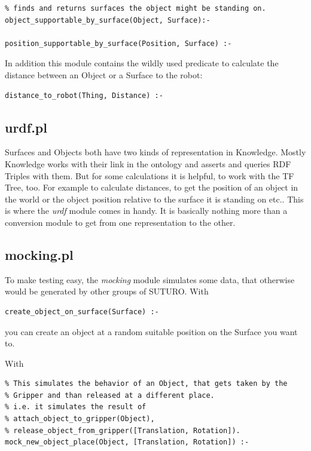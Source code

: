 \documentclass[main.tex]{subfiles}
\begin{document}
\begin{lstlisting}
% finds and returns surfaces the object might be standing on.
object_supportable_by_surface(Object, Surface):-

position_supportable_by_surface(Position, Surface) :-
\end{lstlisting}

In addition this module contains the wildly used predicate to calculate the distance between an Object or a Surface to the robot:

\begin{lstlisting}
distance_to_robot(Thing, Distance) :-
\end{lstlisting}

\subsection{urdf.pl}

Surfaces and Objects both have two kinds of representation in Knowledge. Mostly Knowledge works with their link in the ontology and asserts and queries RDF Triples with them. But for some calculations it is helpful, to work with the TF Tree, too. For example to calculate distances, to get the position of an object in the world or the object position relative to the surface it is standing on etc.. This is where the \textit{urdf} module comes in handy. It is basically nothing more than a conversion module to get from one representation to the other.

\subsection{mocking.pl}

To make testing easy, the \textit{mocking} module simulates some data, that otherwise would be generated by other groups of SUTURO. With

\begin{lstlisting}
create_object_on_surface(Surface) :-
\end{lstlisting}

you can create an object at a random suitable position on the Surface you want to. 

With 

\begin{lstlisting}
% This simulates the behavior of an Object, that gets taken by the 
% Gripper and than released at a different place.
% i.e. it simulates the result of
% attach_object_to_gripper(Object),
% release_object_from_gripper([Translation, Rotation]).
mock_new_object_place(Object, [Translation, Rotation]) :-
\end{lstlisting}
\end{document}
